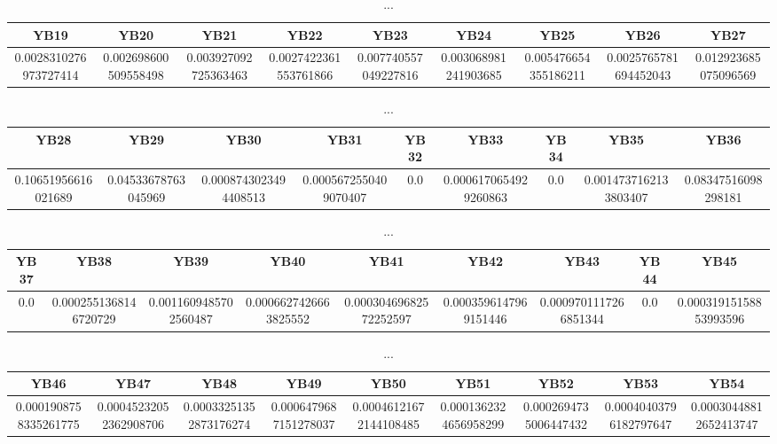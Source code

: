 \documentclass[]{article}
\begin{document}
\begin{table}[h]
      \centering
      \begin{tabular}{|c|c|c|c|c|c|c|c|c|}
            \hline
            YB19                  & YB20                 & YB21                 & YB22                  & YB23                 & YB24                 & YB25                 & YB26                  & YB27                 \\
            \hline
            0.0028310276973727414 & 0.002698600509558498 & 0.003927092725363463 & 0.0027422361553761866 & 0.007740557049227816 & 0.003068981241903685 & 0.005476654355186211 & 0.0025765781694452043 & 0.012923685075096569 \\
            \hline
      \end{tabular}
      \caption{...}
\end{table}
\begin{table}[h]
      \centering
      \begin{tabular}{|c|c|c|c|c|c|c|c|c|}
            \hline
            YB28                & YB29                & YB30                  & YB31                  & YB32 & YB33                  & YB34 & YB35                  & YB36                \\
            \hline
            0.10651956616021689 & 0.04533678763045969 & 0.0008743023494408513 & 0.0005672550409070407 & 0.0  & 0.0006170654929260863 & 0.0  & 0.0014737162133803407 & 0.08347516098298181 \\
            \hline
      \end{tabular}
      \caption{...}
\end{table}
\begin{table}[h]
      \centering
      \begin{tabular}{|c|c|c|c|c|c|c|c|c|}
            \hline
            YB37 & YB38                  & YB39                  & YB40                  & YB41                   & YB42                  & YB43                  & YB44 & YB45                   \\
            \hline
            0.0  & 0.0002551368146720729 & 0.0011609485702560487 & 0.0006627426663825552 & 0.00030469682572252597 & 0.0003596147969151446 & 0.0009701117266851344 & 0.0  & 0.00031915158853993596 \\
            \hline
      \end{tabular}
      \caption{...}
\end{table}
\begin{table}[h]
      \centering
      \begin{tabular}{|c|c|c|c|c|c|c|c|c|}
            \hline
            YB46                  & YB47                   & YB48                   & YB49                  & YB50                   & YB51                  & YB52                  & YB53                   & YB54                   \\
            \hline
            0.0001908758335261775 & 0.00045232052362908706 & 0.00033251352873176274 & 0.0006479687151278037 & 0.00046121672144108485 & 0.0001362324656958299 & 0.0002694735006447432 & 0.00040403796182797647 & 0.00030448812652413747 \\
            \hline
      \end{tabular}
      \caption{...}
\end{table}
\end{document}

